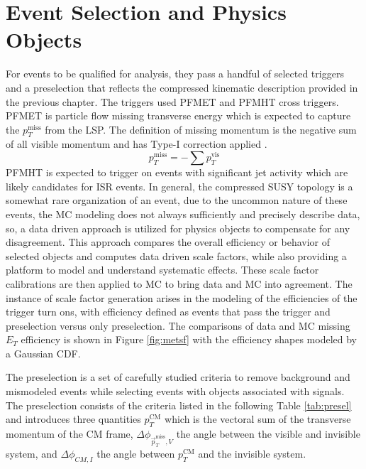 \section{Event Selection and Physics Objects}
 For events to be qualified for analysis, they pass a handful of selected triggers and a preselection that reflects the compressed kinematic description provided in the previous chapter. The triggers used PFMET and PFMHT cross triggers. PFMET is particle flow missing transverse energy which is expected to capture the $p_T^{\text{miss}}$ from the LSP. The definition of missing momentum is the negative sum of all visible momentum and has Type-I correction applied \cite{CMS:2008oxa}. 
\begin{equation}
p_T^{\text{miss}} = -\sum{p_T^{\text{vis}}}
\end{equation} 
PFMHT is expected to trigger on events with significant jet activity which are likely candidates for ISR events.  In general, the compressed SUSY topology is a somewhat rare organization of an event, due to the uncommon nature of these events, the MC modeling does not always sufficiently and precisely describe data, so,  a data driven approach is utilized for physics objects to compensate for any disagreement. This approach compares the overall efficiency or behavior of selected objects and computes data driven scale factors, while also providing a platform to model and understand systematic effects. These scale factor calibrations are then applied to MC to bring data and MC into agreement. The instance of scale factor generation arises in the modeling of the efficiencies of the trigger turn ons, with efficiency defined as events that pass the trigger and preselection versus only preselection. The comparisons of data and MC missing $E_T$ efficiency is shown in Figure \ref{fig:metsf} with the efficiency shapes modeled by a Gaussian CDF.  


The preselection is a set of carefully studied criteria to remove background and mismodeled events while selecting events with objects associated with signals. The preselection consists of the criteria listed in the following Table \ref{tab:presel} and introduces three quantities $p_T^{\text{CM}}$ which is the vectoral sum of the transverse momentum of the CM frame, $\Delta \phi_{\vec{p}_T^{\text{miss}}, V}$ the angle between the visible and invisible system, and $\Delta\phi_{CM,I}$ the angle between $p_T^{\text{CM}}$ and the invisible system.

